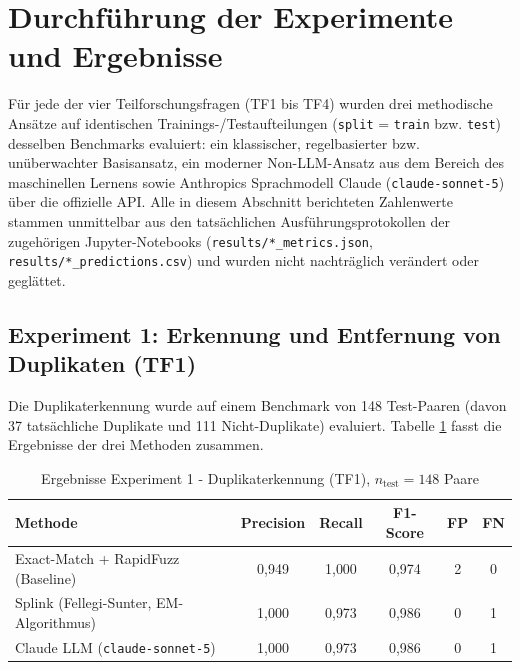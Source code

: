 
\section{Durchführung der Experimente und Ergebnisse}

Für jede der vier Teilforschungsfragen (TF1 bis TF4) wurden drei methodische
Ansätze auf identischen Trainings-/Testaufteilungen (\texttt{split} = \texttt{train}
bzw. \texttt{test}) desselben Benchmarks evaluiert: ein klassischer, regelbasierter
bzw. unüberwachter Basisansatz, ein moderner Non-LLM-Ansatz aus dem Bereich des
maschinellen Lernens sowie Anthropics Sprachmodell Claude (\texttt{claude-sonnet-5})
über die offizielle API. Alle in diesem Abschnitt berichteten Zahlenwerte stammen
unmittelbar aus den tatsächlichen Ausführungsprotokollen der zugehörigen Jupyter-Notebooks
(\texttt{results/*\_metrics.json}, \texttt{results/*\_predictions.csv}) und wurden nicht
nachträglich verändert oder geglättet.

\subsection{Experiment 1: Erkennung und Entfernung von Duplikaten (TF1)}
\label{sec:experiment-tf1}

Die Duplikaterkennung wurde auf einem Benchmark von 148 Test-Paaren (davon 37
tatsächliche Duplikate und 111 Nicht-Duplikate) evaluiert. Tabelle
\ref{tab:tf1-ergebnisse} fasst die Ergebnisse der drei Methoden zusammen.

\begin{table}[htbp]
\centering
\caption{Ergebnisse Experiment 1 - Duplikaterkennung (TF1), $n_{\text{test}} = 148$ Paare}
\label{tab:tf1-ergebnisse}
\begin{tabular}{lccccc}
\toprule
\rowcolor{headerblue}
\textbf{Methode} & \textbf{Precision} & \textbf{Recall} & \textbf{F1-Score} & \textbf{FP} & \textbf{FN} \\
\midrule
\rowcolor{lightgray}
Exact-Match + RapidFuzz (Baseline) & 0{,}949 & 1{,}000 & 0{,}974 & 2 & 0 \\
Splink (Fellegi-Sunter, EM-Algorithmus) & 1{,}000 & 0{,}973 & 0{,}986 & 0 & 1 \\
\rowcolor{lightgray}
Claude LLM (\texttt{claude-sonnet-5}) & 1{,}000 & 0{,}973 & 0{,}986 & 0 & 1 \\
\bottomrule
\end{tabular}
\end{table}

